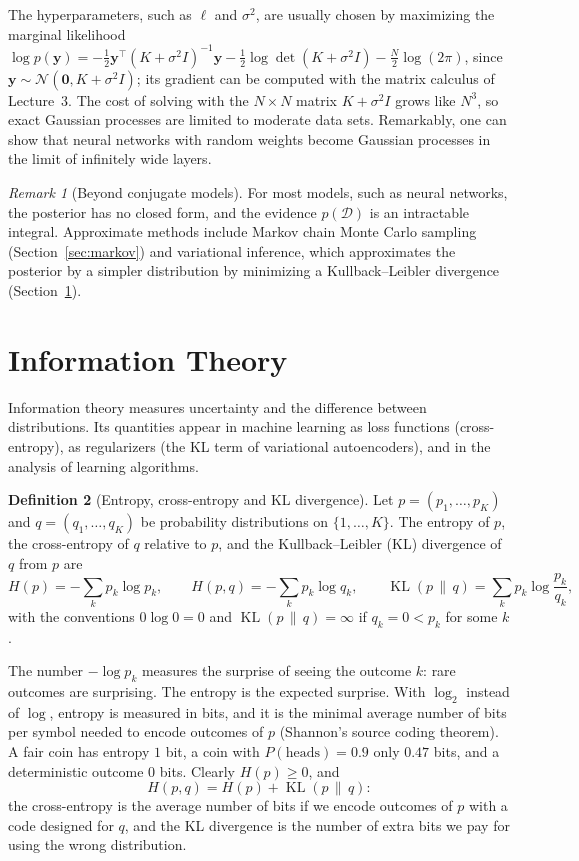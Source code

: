 \documentclass[11pt]{article}
\DeclareMathOperator{\KL}{KL}
\theoremstyle{definition}
\newtheorem{definition}{Definition}[section]
\theoremstyle{plain}
\theoremstyle{remark}
\newtheorem{remark}[definition]{Remark}
\begin{document}
The hyperparameters, such as $\ell$ and $\sigma^2$, are usually chosen by maximizing the marginal likelihood $\log p(\mathbf{y}) = -\frac{1}{2}\mathbf{y}^\top(K + \sigma^2 I)^{-1}\mathbf{y} - \frac{1}{2}\log\det(K + \sigma^2 I) - \frac{N}{2}\log(2\pi)$, since $\mathbf{y} \sim \mathcal{N}(\mathbf{0}, K + \sigma^2 I)$; its gradient can be computed with the matrix calculus of Lecture~3. The cost of solving with the $N \times N$ matrix $K + \sigma^2 I$ grows like $N^3$, so exact Gaussian processes are limited to moderate data sets. Remarkably, one can show that neural networks with random weights become Gaussian processes in the limit of infinitely wide layers.

\begin{remark}[Beyond conjugate models]
    For most models, such as neural networks, the posterior has no closed form, and the evidence $p(\mathcal{D})$ is an intractable integral. Approximate methods include Markov chain Monte Carlo sampling (Section~\ref{sec:markov}) and variational inference, which approximates the posterior by a simpler distribution by minimizing a Kullback--Leibler divergence (Section~\ref{sec:information}).
\end{remark}

\section{Information Theory}\label{sec:information}

Information theory measures uncertainty and the difference between distributions. Its quantities appear in machine learning as loss functions (cross-entropy), as regularizers (the KL term of variational autoencoders), and in the analysis of learning algorithms.

\begin{definition}[Entropy, cross-entropy and KL divergence]\label{def:entropy}
    Let $p = (p_1, \ldots, p_K)$ and $q = (q_1, \ldots, q_K)$ be probability distributions on $\{1, \ldots, K\}$. The entropy of $p$, the cross-entropy of $q$ relative to $p$, and the Kullback--Leibler (KL) divergence of $q$ from $p$ are
    \[H(p) = -\sum_k p_k\log p_k, \qquad H(p, q) = -\sum_k p_k\log q_k, \qquad \KL(p \,\|\, q) = \sum_k p_k\log\frac{p_k}{q_k},\]
    with the conventions $0\log 0 = 0$ and $\KL(p \,\|\, q) = \infty$ if $q_k = 0 < p_k$ for some $k$.
\end{definition}

The number $-\log p_k$ measures the surprise of seeing the outcome $k$: rare outcomes are surprising. The entropy is the expected surprise. With $\log_2$ instead of $\log$, entropy is measured in bits, and it is the minimal average number of bits per symbol needed to encode outcomes of $p$ (Shannon's source coding theorem). A fair coin has entropy $1$ bit, a coin with $P(\text{heads}) = 0.9$ only $0.47$ bits, and a deterministic outcome $0$ bits. Clearly $H(p) \geq 0$, and
\[H(p, q) = H(p) + \KL(p \,\|\, q):\]
the cross-entropy is the average number of bits if we encode outcomes of $p$ with a code designed for $q$, and the KL divergence is the number of extra bits we pay for using the wrong distribution.
\end{document}

